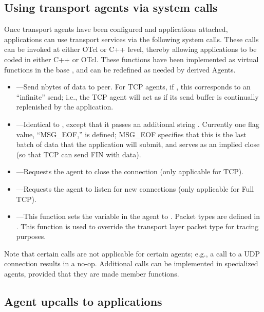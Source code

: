 \subsection{Using transport agents via system calls}
\label{sec:systemcalls}
Once transport agents have been configured and applications attached, 
applications can use transport 
services via the following system calls.  These calls can be invoked at either
OTcl or C++ level, thereby allowing applications to be coded in either C++ or
OTcl.  These functions have been implemented as virtual functions in the base
, and can be redefined as needed by derived Agents. 
\begin{itemize}
\item {}---Send nbytes of data to peer.  For TCP agents,
if , this corresponds to an ``infinite'' send; i.e., the
TCP agent will act as if its send buffer is continually replenished by the
application.
\item {}---Identical to 
, except that it passes an additional string 
.  Currently one flag value, ``MSG\_EOF,'' is defined; MSG\_EOF
specifies that this is the last batch of data that the application will 
submit, and serves as an implied close (so that TCP can send FIN with data).
\item {}---Requests the agent to close the connection (only 
applicable for TCP).
\item {}---Requests the agent to listen for new connections
(only applicable for Full TCP).
\item {}---This function sets the  
variable in the agent to .  Packet types are defined in 
.  This function is used to override the transport layer 
packet type for tracing purposes.  
\end{itemize}
Note that certain calls are not applicable for certain agents; e.g., a call
to  a UDP connection results in a no-op.  Additional calls
can be implemented in specialized agents, provided that they are made
 member functions. 

\subsection{Agent upcalls to applications}
\label{sec:upcalls}

